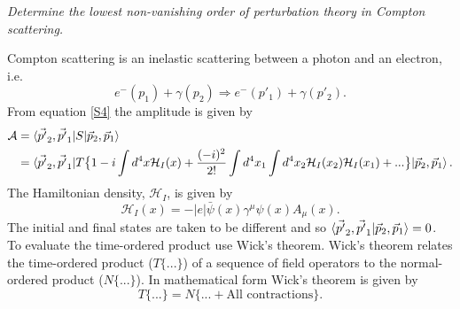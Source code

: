 \begin{example}
	\emph{Determine the lowest non-vanishing order of perturbation theory in Compton scattering.}\newline
	
	Compton scattering is an inelastic scattering between a photon and an electron,  i.e.
	\begin{equation}
		e^-(p_1)+\gamma(p_2)\Rightarrow e^-(p'_1)+\gamma(p'_2).
	\end{equation} 
	From equation \eqref{S4} the amplitude is given by
	\begin{equation}
		\begin{split}
			\mathcal{A}&=\braket{\vec{p'}_2,\vec{p'}_1|S|\vec{p}_2, \vec{p}_1}\\
			&=\braket{\vec{p'}_2,\vec{p'}_1|T\big\{1-i\int d^4x\mathcal{H}_I(x)+\frac{(-i)^2}{2!}\int d^4x_1\int d^4 x_2\mathcal{H}_I(x_2)\mathcal{H}_I(x_1)+...\big\}|\vec{p}_2, \vec{p}_1}.\\
		\end{split}
		\label{he}
	\end{equation} 
	The Hamiltonian density, $\mathcal{H}_I$, is given by
	\begin{equation}
		\mathcal{H}_{I}(x)=-|e|\bar{\psi}(x)\gamma^\mu\psi(x)A_\mu(x).
		\label{Hi}
	\end{equation} 
	The initial and final states are taken to be different and so $\braket{\vec{p'}_2,\vec{p'}_1|\vec{p}_2, \vec{p}_1}=0$. To evaluate the  time-ordered product use Wick's theorem. Wick's theorem relates the time-ordered product ($T\{...\}$) of a sequence of field operators to the normal-ordered product ($N\{...\}$). In mathematical form Wick's theorem is given by
	\begin{equation}
		T\{...\}=N\{...+\text{All contractions}\}.
	\end{equation} 

\end{example}

